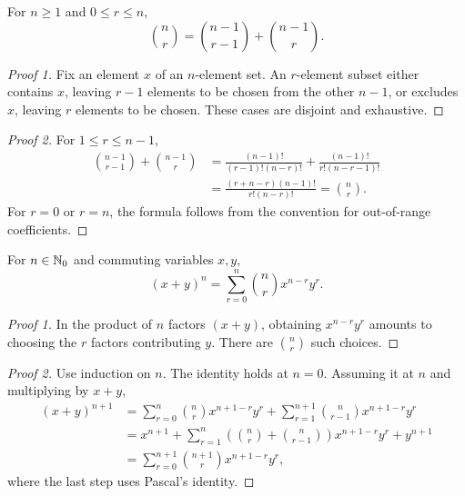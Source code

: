 \documentclass[11pt, oneside]{article}
\begin{document}
\begin{proposition}\label{prop:pascal}
For $n\ge1$ and $0\le r\le n$,
\[
\binom nr=\binom{n-1}{r-1}+\binom{n-1}{r}.
\]
\end{proposition}
\begin{proof}[Proof 1]
Fix an element $x$ of an $n$-element set. An $r$-element subset either contains $x$, leaving $r-1$ elements to be chosen from the other $n-1$, or excludes $x$, leaving $r$ elements to be chosen. These cases are disjoint and exhaustive.
\end{proof}
\begin{proof}[Proof 2]
For $1\le r\le n-1$,
\[
\begin{aligned}
\binom{n-1}{r-1}+\binom{n-1}{r}
&=\frac{(n-1)!}{(r-1)!(n-r)!}+\frac{(n-1)!}{r!(n-r-1)!}\\
&=\frac{(r+n-r)(n-1)!}{r!(n-r)!}
=\binom nr.
\end{aligned}
\]
For $r=0$ or $r=n$, the formula follows from the convention for out-of-range coefficients.
\end{proof}

\begin{theorem}\label{thm:binomial}
For $n\in\mathbb{N}_0$ and commuting variables $x, y$,
\[
(x+y)^n=\sum_{r=0}^n\binom nr x^{n-r}y^r.
\]
\end{theorem}
\begin{proof}[Proof 1]
In the product of $n$ factors $(x+y)$, obtaining $x^{n-r}y^r$ amounts to choosing the $r$ factors contributing $y$. There are $\binom nr$ such choices.
\end{proof}
\begin{proof}[Proof 2]
Use induction on $n$. The identity holds at $n=0$. Assuming it at $n$ and multiplying by $x+y$,
\[
\begin{aligned}
(x+y)^{n+1}
&=\sum_{r=0}^n\binom nr x^{n+1-r}y^r
 +\sum_{r=1}^{n+1}\binom n{r-1}x^{n+1-r}y^r\\
&=x^{n+1}+\sum_{r=1}^n
\left(\binom nr+\binom n{r-1}\right)x^{n+1-r}y^r+y^{n+1}\\
&=\sum_{r=0}^{n+1}\binom{n+1}{r}x^{n+1-r}y^r,
\end{aligned}
\]
where the last step uses Pascal's identity.
\end{proof}
\end{document}
